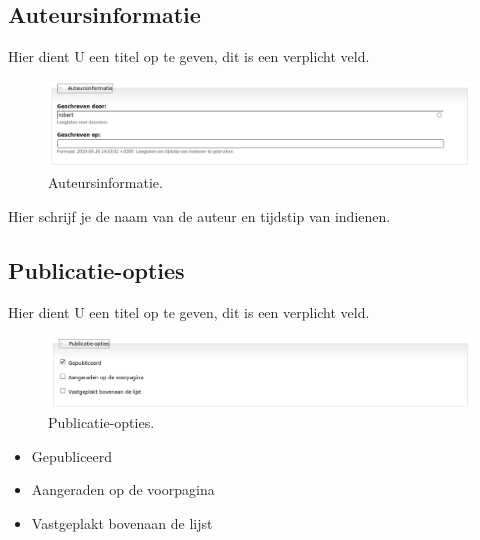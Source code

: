 \subsection{Auteursinformatie} 
Hier dient U een titel op te geven, dit is een verplicht veld.
 \begin{figure}[!h]
    \centering
   \includegraphics[scale=0.3,angle=0]{auteursinformatie}
   \caption{Auteursinformatie.\label{white}}
 \end{figure}
Hier schrijf je de naam van de auteur en tijdstip van indienen.

\subsection{Publicatie-opties} 
Hier dient U een titel op te geven, dit is een verplicht veld.
 \begin{figure}[!h]
    \centering
   \includegraphics[scale=0.3,angle=0]{publicatie-opties}
   \caption{Publicatie-opties.\label{white}}
 \end{figure}
\begin{itemize}
  \item Gepubliceerd
  \item Aangeraden op de voorpagina
  \item Vastgeplakt bovenaan de lijst
\end{itemize}


